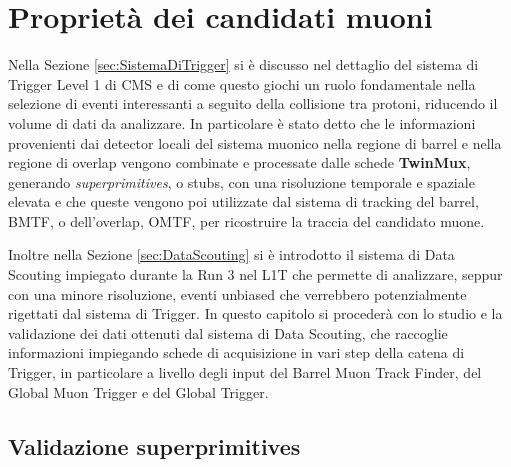 \chapter{Proprietà dei candidati muoni}
\label{cap:SecondoCapitolo}

Nella Sezione \ref{sec:SistemaDiTrigger} si è discusso nel dettaglio del sistema di Trigger Level 1 di CMS e di come questo giochi un ruolo fondamentale nella selezione di eventi interessanti a seguito della collisione tra protoni, riducendo il volume di dati da analizzare. In particolare è stato detto che le informazioni provenienti dai detector locali del sistema muonico nella regione di barrel e nella regione di overlap vengono combinate e processate dalle schede \textbf{TwinMux}, generando \textit{superprimitives}, o stubs, con una risoluzione temporale e spaziale elevata e che queste vengono poi utilizzate dal sistema di tracking del barrel, BMTF, o dell'overlap, OMTF, per ricostruire la traccia del candidato muone.

Inoltre nella Sezione \ref{sec:DataScouting} si è introdotto il sistema di Data Scouting impiegato durante la Run 3 nel L1T che permette di analizzare, seppur con una minore risoluzione, eventi unbiased che verrebbero potenzialmente rigettati dal sistema di Trigger. In questo capitolo si procederà con lo studio e la validazione dei dati ottenuti dal sistema di Data Scouting, che raccoglie informazioni impiegando schede di acquisizione in vari step della catena di Trigger, in particolare a livello degli input del Barrel Muon Track Finder, del Global Muon Trigger e del Global Trigger.


\section{Validazione superprimitives}
\label{sec:Superprimitives}

